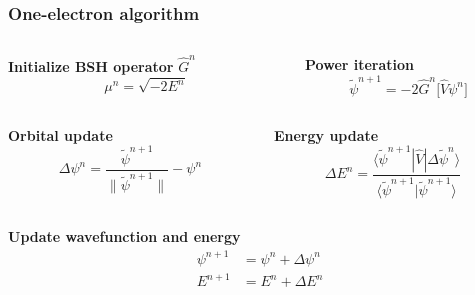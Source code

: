 \documentclass[mathserif, 10pt]{beamer}
\begin{document}
\begin{frame}
    \frametitle{One-electron algorithm}
    \begin{columns}
    \begin{column}{.50\textwidth}
    \centering
    \textbf{Initialize BSH operator} $\hat{G}^n$
    \begin{equation}
        \nonumber
        \mu^n = \sqrt{-2E^n}
    \end{equation}
    \end{column}

    \begin{column}{.50\textwidth}
    \centering
    \textbf{Power iteration}
    \begin{equation}
	\nonumber
	\tilde{\psi}^{n+1} = -2\hat{G}^n \Big[ \hat{V} \psi^n \Big]
    \end{equation}
    \end{column}
    \end{columns}

    \vspace{5mm}

    \begin{columns}
    \begin{column}{.50\textwidth}
    \centering
    \textbf{Orbital update}
    \begin{equation}
	\nonumber
	\Delta\psi^n = \frac{\tilde{\psi}^{n+1}}{\|\tilde{\psi}^{n+1}\|} - \psi^n
    \end{equation}
    \end{column}

    \begin{column}{.50\textwidth}
    \centering
    \textbf{Energy update}
    \begin{equation}
	\nonumber
	\Delta E^n =
        \frac{\langle\tilde{\psi}^{n+1}|\hat{V}|\Delta\tilde{\psi}^n\rangle}
        {\langle\tilde{\psi}^{n+1}|\tilde{\psi}^{n+1}\rangle}
    \end{equation}
    \end{column}
    \end{columns}

    \vspace{10mm}

    \centering
    \textbf{Update wavefunction and energy}
    \begin{align}
	\nonumber
        \psi^{n+1}  &= \psi^n + \Delta \psi^n\\
	\nonumber
        E^{n+1}     &= E^n + \Delta E^n
    \end{align}
\end{frame}
\end{document}

